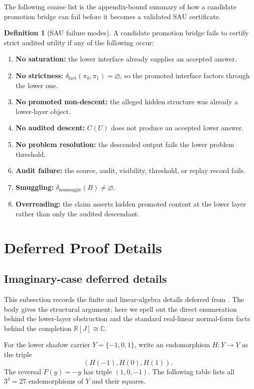 \documentclass[11pt]{article}
\theoremstyle{definition}
\newtheorem{definition}[theorem]{Definition}
\begin{document}
The following coarse list is the appendix-bound summary of how a candidate
promotion bridge can fail before it becomes a validated SAU certificate.

\begin{definition}[SAU failure modes]
\label{def:sau-failure-modes}
A candidate promotion bridge fails to certify strict audited utility if any of the following occur:
\begin{enumerate}
\item \textbf{No saturation:} the lower interface already supplies an accepted answer.
\item \textbf{No strictness:} \(\delta_{\mathrm{fact}}(\pi_0,\pi_1)=\varnothing\), so the promoted interface factors through the lower one.
\item \textbf{No promoted non-descent:} the alleged hidden structure was already a lower-layer object.
\item \textbf{No audited descent:} \(C(U)\) does not produce an accepted lower answer.
\item \textbf{No problem resolution:} the descended output fails the lower problem threshold.
\item \textbf{Audit failure:} the source, audit, visibility, threshold, or replay record fails.
\item \textbf{Smuggling:} \(\delta_{\mathrm{nosmuggle}}(B)\neq\varnothing\).
\item \textbf{Overreading:} the claim asserts hidden promoted content at the lower layer rather than only the audited descendant.
\end{enumerate}
\end{definition}
 \section{Deferred Proof Details}\label{app:methods}

\subsection{Imaginary-case deferred details}
\label{appsubsec:methods-imaginary}

This subsection records the finite and linear-algebra details deferred from
.  The body gives the structural argument; here we spell out
the direct enumeration behind the lower-layer obstruction and the standard
real-linear normal-form facts behind the completion \(\mathbb R[J]\cong\mathbb C\).

For the lower shadow carrier \(Y=\{-1,0,1\}\), write an endomorphism
\(H:Y\to Y\) as the triple
\[
(H(-1),H(0),H(1)).
\]
The reversal \(F(y)=-y\) has triple \((1,0,-1)\).  The following table lists all
\(3^3=27\) endomorphisms of \(Y\) and their squares.
\end{document}
